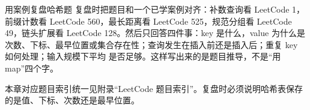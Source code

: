 \begin{principlebox}{用案例复盘哈希题}
复盘时把题目和一个已学案例对齐：补数查询看 LeetCode 1，前缀计数看 LeetCode 560，最长距离看 LeetCode 525，规范分组看 LeetCode 49，链头扩展看 LeetCode 128。然后只回答四件事：key 是什么，value 为什么是次数、下标、最早位置或集合存在性；查询发生在插入前还是插入后；重复 key 如何处理；输入规模下平均  是否足够。这样写出来的是题目推导，不是“用 map”四个字。
\end{principlebox}

本章对应题目索引统一见附录“LeetCode 题目索引”。复盘时必须说明哈希表保存的是值、下标、次数还是最早位置。




